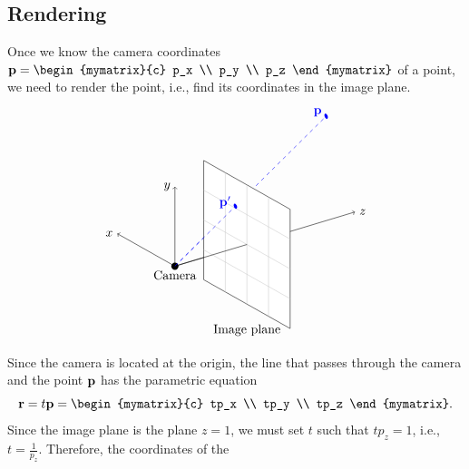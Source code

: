 \subsection*{Rendering}

Once we know the camera coordinates
$\vect{p}=\begin{mymatrix}{c} p_x \\ p_y \\ p_z \end{mymatrix}$ of a point,
we need to render the point, i.e., find its coordinates in the image plane.
\begin{equation*}
  \begin{tikzpicture}
    \fill (0,0) circle (0.1) node[below] {Camera};
    \begin{scope}[x={(-0.8cm,0.45cm)},z={(1cm,0.3cm)},y={(0cm,1.1cm)}]
      \draw[->] (0,0,0) -- (2,0,0) node[left]{$x$};
      \draw[->] (0,0,0) -- (0,2,0) node[left]{$y$};
      \draw[->] (0,0,0) -- (0,0,5) node[right]{$z$};
      \draw[dashed,blue] (0,0,0) -- (1,2,5);
      \draw[fill=white] (-1.5,-1.5,2) -- (-1.5,1.5,2) -- (1.5,1.5,2) -- (1.5,-1.5,2) -- cycle;
      \draw[thin,black!20] (-1.5,-0.75,2) -- (1.5,-0.75,2);
      \draw[thin,black!20] (-1.5,0,2) -- (1.5,0,2);
      \draw[thin,black!20] (-1.5,0.75,2) -- (1.5,0.75,2);
      \draw[thin,black!20] (-0.75,-1.5,2) -- (-0.75,1.5,2);
      \draw[thin,black!20] (0,-1.5,2) -- (0,1.5,2);
      \draw[thin,black!20] (0.75,-1.5,2) -- (0.75,1.5,2);
      \fill[blue] (1,2,5) circle (0.06) +(0,0.1,0) node[left] {$\vect{p}$};
      \fill[blue] (0.4,0.8,2) circle (0.06) +(0,0.1,0) node[left] {$\vect{p}'$};
      \draw (0,0,0) -- (0,0,2);
      \draw[dashed,blue] (0,0,0) -- (0.4,0.8,2);
      \path (0,-1.9,2) node[below] {Image plane};
    \end{scope}
  \end{tikzpicture}
\end{equation*}
Since the camera is located at the origin, the line that passes
through the camera and the point $\mbox{\bf p}$ has the parametric equation
\begin{equation*}
  \vect{r} = t\vect{p} = \begin{mymatrix}{c} tp_x \\ tp_y \\ tp_z \end{mymatrix}.
\end{equation*}
Since the image plane is the plane $z=1$, we must set $t$ such that
$tp_z = 1$, i.e., $t=\frac{1}{p_z}$. Therefore, the coordinates of the
